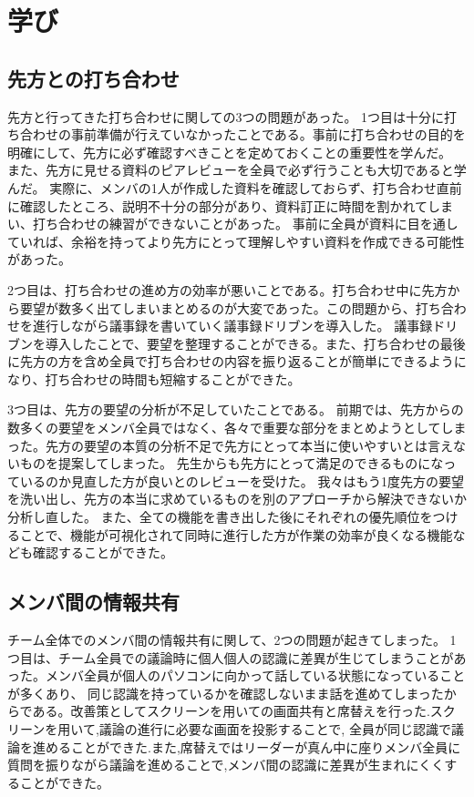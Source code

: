 \chapter{学び}
\section{先方との打ち合わせ}
先方と行ってきた打ち合わせに関しての3つの問題があった。
1つ目は十分に打ち合わせの事前準備が行えていなかったことである。事前に打ち合わせの目的を明確にして、先方に必ず確認すべきことを定めておくことの重要性を学んだ。
また、先方に見せる資料のピアレビューを全員で必ず行うことも大切であると学んだ。
実際に、メンバの1人が作成した資料を確認しておらず、打ち合わせ直前に確認したところ、説明不十分の部分があり、資料訂正に時間を割かれてしまい、打ち合わせの練習ができないことがあった。
事前に全員が資料に目を通していれば、余裕を持ってより先方にとって理解しやすい資料を作成できる可能性があった。

2つ目は、打ち合わせの進め方の効率が悪いことである。打ち合わせ中に先方から要望が数多く出てしまいまとめるのが大変であった。この問題から、打ち合わせを進行しながら議事録を書いていく議事録ドリブンを導入した。
議事録ドリブンを導入したことで、要望を整理することができる。また、打ち合わせの最後に先方の方を含め全員で打ち合わせの内容を振り返ることが簡単にできるようになり、打ち合わせの時間も短縮することができた。

3つ目は、先方の要望の分析が不足していたことである。
前期では、先方からの数多くの要望をメンバ全員ではなく、各々で重要な部分をまとめようとしてしまった。先方の要望の本質の分析不足で先方にとって本当に使いやすいとは言えないものを提案してしまった。
先生からも先方にとって満足のできるものになっているのか見直した方が良いとのレビューを受けた。
我々はもう1度先方の要望を洗い出し、先方の本当に求めているものを別のアプローチから解決できないか分析し直した。
また、全ての機能を書き出した後にそれぞれの優先順位をつけることで、機能が可視化されて同時に進行した方が作業の効率が良くなる機能なども確認することができた。

\section{メンバ間の情報共有}
チーム全体でのメンバ間の情報共有に関して、2つの問題が起きてしまった。
1つ目は、チーム全員での議論時に個人個人の認識に差異が生じてしまうことがあった。メンバ全員が個人のパソコンに向かって話している状態になっていることが多くあり、
同じ認識を持っているかを確認しないまま話を進めてしまったからである。改善策としてスクリーンを用いての画面共有と席替えを行った.スクリーンを用いて,議論の進行に必要な画面を投影することで,
全員が同じ認識で議論を進めることができた.また,席替えではリーダーが真ん中に座りメンバ全員に質問を振りながら議論を進めることで,メンバ間の認識に差異が生まれにくくすることができた。

